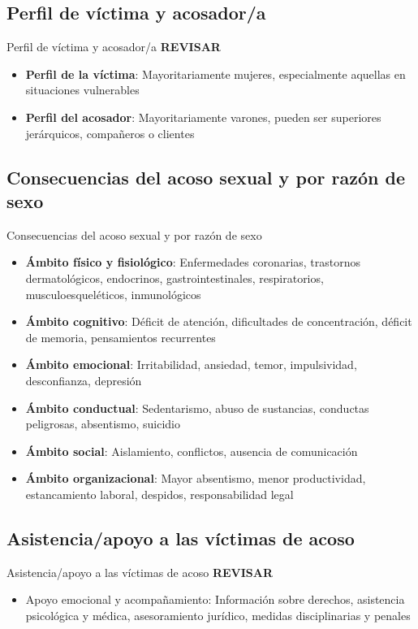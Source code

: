 \documentclass{beamer}
\begin{document}
    \subsection{Perfil de víctima y acosador/a}
    \begin{frame}{Perfil de víctima y acosador/a}
        \textbf{REVISAR}
        \begin{itemize}
            \item \textbf{Perfil de la víctima}: Mayoritariamente mujeres, especialmente aquellas en situaciones vulnerables
            \item \textbf{Perfil del acosador}: Mayoritariamente varones, pueden ser superiores jerárquicos, compañeros o clientes
        \end{itemize}
    \end{frame}

    \subsection{Consecuencias del acoso sexual y por razón de sexo}
    \begin{frame}{Consecuencias del acoso sexual y por razón de sexo}
        \begin{itemize}
            \item \textbf{Ámbito físico y fisiológico}: Enfermedades coronarias, trastornos dermatológicos, endocrinos, gastrointestinales, respiratorios, musculoesqueléticos, inmunológicos
            \item \textbf{Ámbito cognitivo}: Déficit de atención, dificultades de concentración, déficit de memoria, pensamientos recurrentes
            \item \textbf{Ámbito emocional}: Irritabilidad, ansiedad, temor, impulsividad, desconfianza, depresión
            \item \textbf{Ámbito conductual}: Sedentarismo, abuso de sustancias, conductas peligrosas, absentismo, suicidio
            \item \textbf{Ámbito social}: Aislamiento, conflictos, ausencia de comunicación
            \item \textbf{Ámbito organizacional}: Mayor absentismo, menor productividad, estancamiento laboral, despidos, responsabilidad legal
        \end{itemize}
    \end{frame}

    \subsection{Asistencia/apoyo a las víctimas de acoso}
    \begin{frame}{Asistencia/apoyo a las víctimas de acoso}
        \textbf{REVISAR}
        \begin{itemize}
            \item Apoyo emocional y acompañamiento: Información sobre derechos, asistencia psicológica y médica, asesoramiento jurídico, medidas disciplinarias y penales
        \end{itemize}
    \end{frame}
\end{document}
